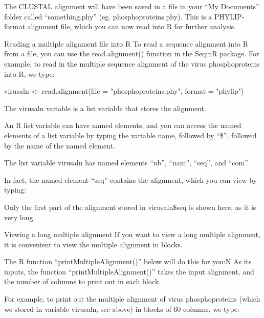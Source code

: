 \documentclass[
]{book}
\newenvironment{Shaded}{\begin{snugshade}}{\end{snugshade}}
\newcommand{\AttributeTok}[1]{\textcolor[rgb]{0.77,0.63,0.00}{#1}}
\newcommand{\FunctionTok}[1]{\textcolor[rgb]{0.00,0.00,0.00}{#1}}
\newcommand{\NormalTok}[1]{#1}
\newcommand{\OtherTok}[1]{\textcolor[rgb]{0.56,0.35,0.01}{#1}}
\newcommand{\SpecialCharTok}[1]{\textcolor[rgb]{0.00,0.00,0.00}{#1}}
\newcommand{\StringTok}[1]{\textcolor[rgb]{0.31,0.60,0.02}{#1}}
\begin{document}
The CLUSTAL alignment will have been saved in a file in your ``My Documents'' folder called ``something.phy'' (eg. phosphoproteins.phy). This is a PHYLIP-format alignment file, which you can now read into R for further analysis.

Reading a multiple alignment file into R
To read a sequence alignment into R from a file, you can use the read.alignment() function in the SeqinR package. For example, to read in the multiple sequence alignment of the virus phosphoproteins into R, we type:

\begin{Shaded}
\begin{Highlighting}[]
\NormalTok{virusaln  }\OtherTok{\textless{}{-}} \FunctionTok{read.alignment}\NormalTok{(}\AttributeTok{file =} \StringTok{"phosphoproteins.phy"}\NormalTok{, }\AttributeTok{format =} \StringTok{"phylip"}\NormalTok{)}
\end{Highlighting}
\end{Shaded}

The virusaln variable is a list variable that stores the alignment.

An R list variable can have named elements, and you can access the named elements of a list variable by typing the variable name, followed by ``\$'', followed by the name of the named element.

The list variable virusaln has named elements ``nb'', ``nam'', ``seq'', and ``com''.

In fact, the named element ``seq'' contains the alignment, which you can view by typing:

\begin{Shaded}
\end{Shaded}

Only the first part of the alignment stored in virusaln\$seq is shown here, as it is very long.

Viewing a long multiple alignment
If you want to view a long multiple alignment, it is convenient to view the multiple alignment in blocks.

The R function ``printMultipleAlignment()'' below will do this for you:N
As its inputs, the function ``printMultipleAlignment()'' takes the input alignment, and the number of columns to print out in each block.

For example, to print out the multiple alignment of virus phosphoproteins (which we stored in variable virusaln, see above) in blocks of 60 columns, we type:
\end{document}
